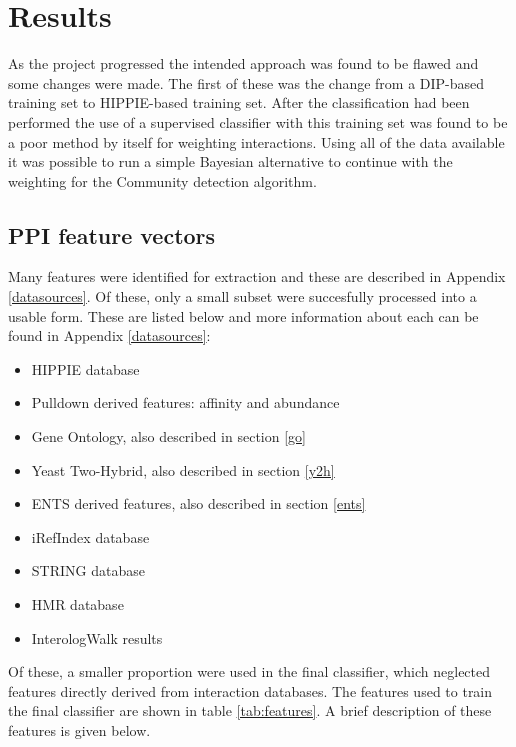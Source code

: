\chapter{Results}
\label{results}


As the project progressed the intended approach was found to be flawed and some changes were made.
The first of these was the change from a DIP-based training set to HIPPIE-based training set.
After the classification had been performed the use of a supervised classifier with this training set was found to be a poor method by itself for weighting interactions.
Using all of the data available it was possible to run a simple Bayesian alternative to continue with the weighting for the Community detection algorithm.

\section{PPI feature vectors}

Many features were identified for extraction and these are described in Appendix \ref{datasources}.
Of these, only a small subset were succesfully processed into a usable form.
These are listed below and more information about each can be found in Appendix \ref{datasources}:

\begin{itemize}
    \item HIPPIE database
    \item Pulldown derived features: affinity and abundance
    \item Gene Ontology, also described in section \ref{go}
    \item Yeast Two-Hybrid, also described in section \ref{y2h}
    \item ENTS derived features, also described in section \ref{ents}
    \item iRefIndex database
    \item STRING database
    \item HMR database 
    \item InterologWalk results
\end{itemize}

Of these, a smaller proportion were used in the final classifier, which neglected features directly derived from interaction databases.
The features used to train the final classifier are shown in table \ref{tab:features}.
A brief description of these features is given below.

